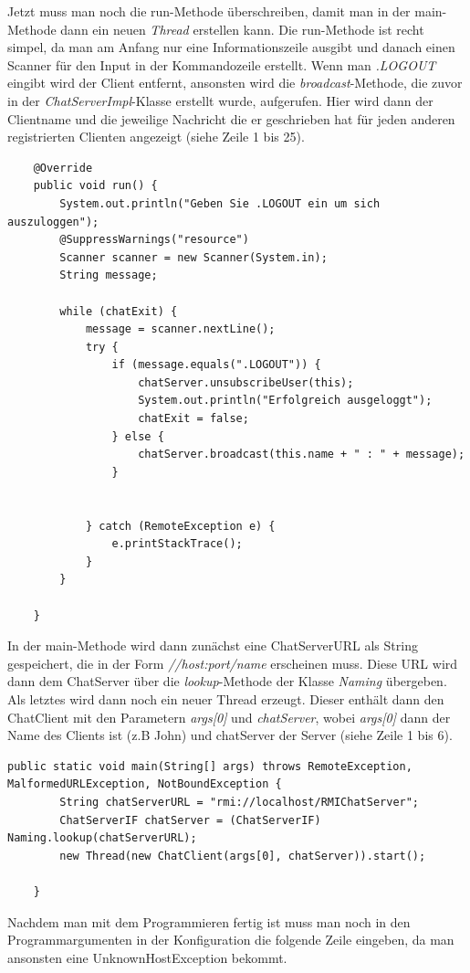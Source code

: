 Jetzt muss man noch die run-Methode überschreiben, damit man in der main-Methode dann ein neuen \textit{Thread} erstellen kann. Die run-Methode ist recht simpel, da man am Anfang nur eine Informationszeile ausgibt und danach einen Scanner für den Input in der Kommandozeile erstellt. Wenn man \textit{.LOGOUT} eingibt wird der Client entfernt, ansonsten wird die \textit{broadcast}-Methode, die zuvor in der \textit{ChatServerImpl}-Klasse erstellt wurde, aufgerufen. Hier wird dann der Clientname und die jeweilige Nachricht die er geschrieben hat für jeden anderen registrierten Clienten angezeigt (siehe Zeile 1 bis 25).

\begin{lstlisting}
	@Override
	public void run() {
		System.out.println("Geben Sie .LOGOUT ein um sich auszuloggen");
		@SuppressWarnings("resource")
		Scanner scanner = new Scanner(System.in);
		String message;
		
		while (chatExit) {
			message = scanner.nextLine();
			try {
				if (message.equals(".LOGOUT")) {
					chatServer.unsubscribeUser(this);
					System.out.println("Erfolgreich ausgeloggt");
					chatExit = false;
				} else {
					chatServer.broadcast(this.name + " : " + message);
				}
				
				
			} catch (RemoteException e) {
				e.printStackTrace();
			}
		}
		
	}
\end{lstlisting}

In der main-Methode wird dann zunächst eine ChatServerURL als String gespeichert, die in der Form \textit{//host:port/name} erscheinen muss. Diese URL wird dann dem ChatServer über die \textit{lookup}-Methode der Klasse \textit{Naming} übergeben. Als letztes wird dann noch ein neuer Thread erzeugt. Dieser enthält dann den ChatClient mit den Parametern \textit{args[0]} und \textit{chatServer}, wobei \textit{args[0]} dann der Name des Clients ist (z.B John) und chatServer der Server (siehe Zeile 1 bis 6).

\begin{lstlisting}
public static void main(String[] args) throws RemoteException, MalformedURLException, NotBoundException {
		String chatServerURL = "rmi://localhost/RMIChatServer";
		ChatServerIF chatServer = (ChatServerIF) Naming.lookup(chatServerURL);
		new Thread(new ChatClient(args[0], chatServer)).start();

	}
\end{lstlisting}

Nachdem man mit dem Programmieren fertig ist muss man noch in den Programmargumenten in der Konfiguration die folgende Zeile eingeben, da man ansonsten eine UnknownHostException bekommt.\cite{[3]}

